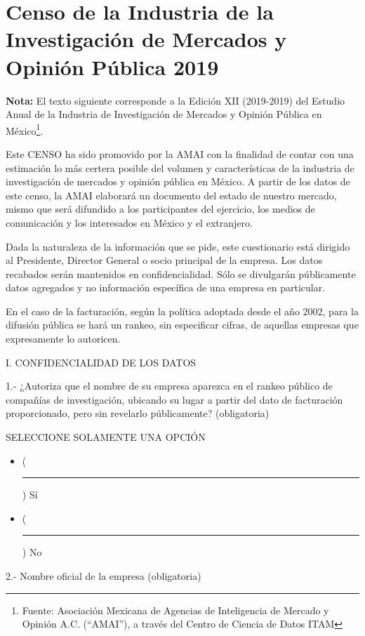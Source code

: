 \chapter{Censo de la Industria de la Investigación de Mercados y Opinión Pública 2019} \label{censo2019}

\textbf{Nota:} El texto siguiente corresponde a la Edición XII (2019-2019) del Estudio Anual de la Industria de Investigación de Mercados y Opinión Pública en México\footnote{Fuente: Asociación Mexicana de Agencias de Inteligencia de Mercado y Opinión A.C. (“AMAI”), a través del Centro de Ciencia de Datos ITAM}.\newline


\noindent Este CENSO ha sido promovido por la AMAI con la finalidad de contar con una estimación lo más certera posible del volumen y características de la industria de investigación de mercados y opinión pública en México.
A partir de los datos de este censo, la AMAI elaborará un documento del estado de nuestro mercado, mismo que será difundido a los participantes del ejercicio, los medios de comunicación y los interesados en México y el extranjero.

Dada la naturaleza de la información que se pide, este cuestionario está dirigido al Presidente, Director General o socio principal de la empresa. Los datos recabados serán mantenidos en confidencialidad.
Sólo se divulgarán públicamente datos agregados y no información específica de una empresa en particular.

En el caso de la facturación, según la política adoptada desde el año 2002, para la difusión pública se hará un rankeo, sin especificar cifras, de aquellas empresas que expresamente lo autoricen.\newline

I. CONFIDENCIALIDAD DE LOS DATOS\newline

1.- ¿Autoriza que el nombre de su empresa aparezca en el rankeo público de compañías de investigación, ubicando su lugar a partir del dato de facturación proporcionado, pero sin revelarlo públicamente? (obligatoria)

SELECCIONE SOLAMENTE UNA OPCIÓN
\begin{itemize}
    \item[1)] (\rule{20mm}{0.1mm}) Sí
    \item[2)] (\rule{20mm}{0.1mm}) No
\end{itemize}

2.- Nombre oficial de la empresa (obligatoria)\newline

